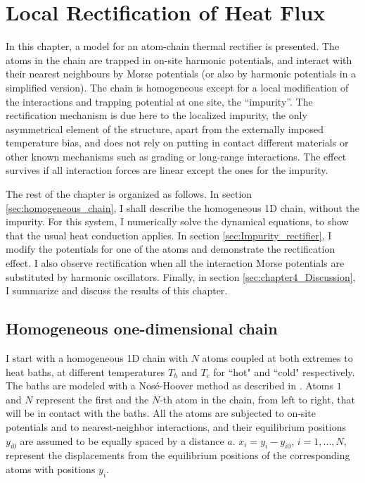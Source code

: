 
\chapter{Local Rectification of Heat Flux}
\label{Chapter4}
%
In this chapter, a model for an atom-chain thermal rectifier is presented. The atoms in the chain are trapped in on-site harmonic potentials, and interact with their nearest neighbours by Morse potentials (or also by harmonic potentials in a simplified version). The chain is homogeneous except for a local modification of the interactions and trapping potential at one site, the ``impurity''. The rectification mechanism is due here to the localized impurity, the only asymmetrical element of the structure, apart from the externally imposed temperature bias, and does not rely on putting in contact different materials or other known mechanisms such as grading or long-range interactions.  The effect survives if all interaction forces are linear except the ones for the impurity.

The rest of the chapter is organized as follows. In section \ref{sec:homogeneous_chain}, I shall describe the homogeneous 1D chain, without the impurity.  For this system, I numerically solve the dynamical equations, to show that the usual heat conduction applies. In section \ref{sec:Impurity_rectifier}, I modify the potentials for one of the atoms and demonstrate the rectification effect. I also observe rectification when all the interaction Morse potentials are substituted by harmonic oscillators. Finally, in section \ref{sec:chapter4_Discussion}, I summarize and discuss the results of this chapter.

\section{Homogeneous one-dimensional chain\label{sec:homogeneous_chain}}

I start with a homogeneous 1D chain with $N$ atoms coupled at both extremes to heat baths, at different temperatures $T_h$ and $T_c$ for ``hot" and ``cold" respectively. The baths are modeled with a Nos\' e-Hoover method as described in \cite{Martyna1992}. Atoms $1$ and $N$ represent the first and the $N$-th atom in the chain, from left to right, that will be in contact with the baths. All the atoms are subjected to on-site potentials and to nearest-neighbor interactions, and their equilibrium positions $y_{i0}$ are assumed to be equally spaced by a distance $a$.
$x_i= y_i-y_{i0}$,
$i=1,...,N$, represent the displacements from the equilibrium positions of the corresponding atoms
with positions $y_i$.

